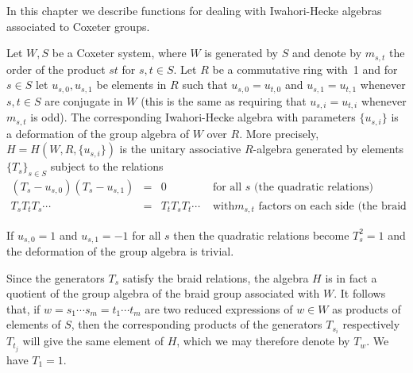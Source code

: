 

In  this  chapter  we  describe  functions  for  dealing with Iwahori-Hecke
algebras associated to Coxeter groups.

Let  $W,S$ be a Coxeter system, where $W$ is generated by $S$ and denote by
$m_{s,t}$  the  order  of  the  product  $st$  for $s,t\in S$. Let $R$ be a
commutative  ring with~1 and for $s\in S$ let $u_{s,0},u_{s,1}$ be elements
in  $R$ such that $u_{s,0}=u_{t,0}$  and $u_{s,1}=u_{t,1}$ whenever $s,t\in
S$ are conjugate in $W$ (this is the same as requiring that
$u_{s,i}=u_{t,i}$   whenever   $m_{s,t}$   is   odd).   The   corresponding
Iwahori-Hecke algebra with parameters $\{u_{s,i}\}$ is a deformation of the
group  algebra of $W$ over $R$.  More precisely, $H=H(W,R, \{u_{s,i}\})$ is
the  unitary associative  $R$-algebra generated  by elements $\{T_s\}_{s\in
S}$    subject   to   the  relations\:   $$\begin{array}{ccll}
(T_s-u_{s,0})(T_s-u_{s,1})  & =  & 0  & \mbox{  for all  $s$ (the quadratic
relations)}\\  T_sT_tT_s  \cdots  &  =  &  T_tT_sT_t  \cdots  & \mbox{ with
$m_{s,t}$ factors on each side (the braid relations)}. \end{array} $$

If $u_{s,0}=1$ and $u_{s,1}=-1$ for all $s$ then the quadratic relations
become $T_s^2=1$ and the
deformation of the group algebra is trivial.

Since  the generators $T_s$ satisfy the braid relations, the algebra $H$ is
in  fact a quotient of the group algebra of the braid group associated with
$W$. It follows that, if $w=s_1 \cdots s_m= t_1 \cdots t_m$ are two reduced
expressions  of  $w  \in  W$  as  products  of  elements  of  $S$, then the
corresponding  products of the  generators $T_{s_i}$ respectively $T_{t_j}$
will  give the same element of $H$, which we may therefore denote by $T_w$.
We have $T_1=1$.

